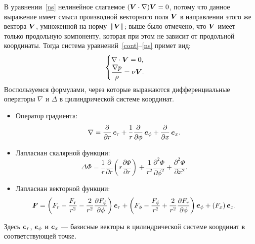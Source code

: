 \documentclass[12pt, a4paper]{article}
\renewcommand{\vec}[1]{\bi{#1}}
\begin{document}
В уравнении~\eqref{ns} нелинейное слагаемое $(\vec V\cdot\nabla)\vec V=0$, потому что данное выражение имеет смысл производной векторного поля $\vec V$ в направлении этого же вектора $\vec V$, умноженной на норму~$\|\vec V\|$; выше было отмечено, что $\vec V$ имеет только продольную компоненту, которая при этом не зависит от продольной координаты.
Тогда система уравнений~\eqref{cont}--\eqref{ns} примет вид:
\begin{equation}
\label{syscyl}
\begin{cases}
	\nabla\cdot\vec V=0,\\
	\dfrac{\nabla p}{\rho}=\nu\Delta\vec V.
	\end{cases}
\end{equation}
Воспользуемся формулами, через которые выражаются дифференциальные операторы $\nabla$ и $\Delta$ в цилиндрической системе координат.
\begin{itemize}
\item Оператор градиента:
\begin{equation}
\label{nabla}
\nabla\Phi =\frac{\partial\Phi}{\partial r}\,\vec e_r +\frac{1}{r}\frac{\partial\Phi}{\partial\phi}\,\vec e_{\phi}+\frac{\partial\Phi}{\partial x}\,\vec e_x.
\end{equation}
\item Лапласиан скалярной функции:
\begin{equation}
\label{Lscalar}
\Delta\Phi  = \frac{1}{r}\frac{\partial}{\partial r}\left( r\frac{\partial\Phi}{\partial r} \right) + \frac{1}{r^2}\frac{\partial^2\Phi}{\partial\phi^2}+\frac{\partial^2\Phi}{\partial x^2}.
\end{equation}
\item Лапласиан векторной функции:
\begin{equation}
\label{Lvec}
\Delta \vec F =\left(\Delta F_r-\frac{F_r}{r^2}-\frac{2}{r^2}\frac{\partial F_{\phi}}{\partial\phi}\right)\vec e_r + \left(\Delta F_{\phi}-\frac{F_{\phi}}{r^2}+\frac{2}{r^2}\frac{\partial F_r}{\partial\phi}\right)\vec e_{\phi}+(\Delta F_x)\,\vec e_x.
\end{equation}
\end{itemize}
Здесь $\vec e_r$, $\vec e_\phi$ и $\vec e_x$ --- базисные векторы в цилиндрической системе координат в соответствующей точке.
\end{document}
